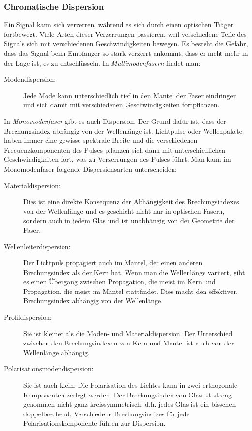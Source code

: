\documentclass[a4paper]{article}
\begin{document}
\subsubsection{Chromatische Dispersion}
Ein Signal kann sich verzerren, während es sich durch einen optischen
Träger fortbewegt. Viele Arten dieser Verzerrungen passieren, weil
verschiedene Teile des Signals sich mit verschiedenen Geschwindigkeiten
bewegen. Es besteht die Gefahr, dass das Signal beim Empfänger so
stark verzerrt ankommt, dass er nicht mehr in der Lage ist, es zu
entschlüsseln. In \emph{Multimodenfasern} findet man:
\begin{description}
  \item[Modendispersion:] Jede Mode kann unterschiedlich
    tief in den Mantel der Faser eindringen und sich damit mit verschiedenen
    Geschwindigkeiten fortpflanzen.
\end{description} 
In \emph{Monomodenfaser} gibt es auch Dispersion. Der Grund
dafür ist, dass der Brechungsindex abhängig von der Wellenlänge ist.
Lichtpulse oder Wellenpakete haben immer eine gewisse spektrale Breite und die
verschiedenen Frequenzkomponenten des Pulses pflanzen sich dann mit
unterschiedlichen Geschwindigkeiten fort, was zu Verzerrungen des Pulses führt.
Man kann im Monomodenfaser folgende Dispersionsarten unterscheiden:
\begin{description}
  \item[Materialdispersion:] Dies ist eine direkte Konsequenz der
    Abhängigkeit des Brechungsindexes von der  Wellenlänge und es geschieht
    nicht nur in optischen Fasern, sondern auch in jedem Glas und ist unabhängig von
    der Geometrie der Faser.
  \item[Wellenleiterdispersion:] Der Lichtpuls propagiert auch im Mantel,
    der einen anderen Brechungsindex als der Kern hat. Wenn man die
    Wellenlänge variiert, gibt es einen Übergang zwischen Propagation,
    die meist im Kern und Propagation, die meist im Mantel stattfindet.
    Dies macht den effektiven Brechungsindex abhängig von der Wellenlänge.
  \item[Profildispersion:] Sie ist kleiner als die Moden- und
    Materialdispersion. Der Unterschied zwischen den Brechungsindexen von Kern
    und Mantel ist auch von der Wellenlänge abhängig.
  \item[Polarisationsmodendispersion:] Sie ist auch klein. Die Polarisation des
    Lichtes kann in zwei orthogonale Komponenten zerlegt werden. Der
    Brechungsindex von Glas ist streng genommen nicht ganz kreissymmetrisch,
    d.h. jedes Glas ist ein bisschen doppelbrechend. Verschiedene
    Brechungsindizes für jede Polarisationskomponente führen zur Dispersion.
\end{description}
\end{document}
